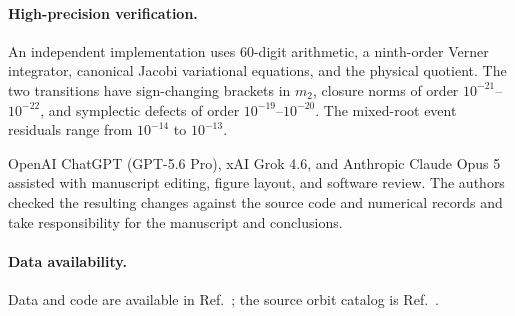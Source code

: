\documentclass[aps,prl,reprint,amsmath,amssymb]{revtex4-2}
\begin{document}
\paragraph{High-precision verification.}
An independent implementation uses $60$-digit arithmetic, a ninth-order
Verner integrator, canonical Jacobi variational equations, and the physical
quotient. The two transitions have sign-changing brackets in $m_2$, closure
norms of order $10^{-21}$--$10^{-22}$, and symplectic defects of order
$10^{-19}$--$10^{-20}$. The mixed-root event residuals range from $10^{-14}$ to
$10^{-13}$.

\begin{acknowledgments}
OpenAI ChatGPT (GPT-5.6 Pro), xAI Grok 4.6, and Anthropic Claude Opus 5
assisted with manuscript editing, figure layout, and software review. The
authors checked the resulting changes against the source code and numerical
records and take responsibility for the manuscript and conclusions.
\end{acknowledgments}

\paragraph{Data availability.}
Data and code are available in Ref.~\cite{chamoeliaz2026data}; the source orbit
catalog is Ref.~\cite{li2021stable}.


\end{document}
